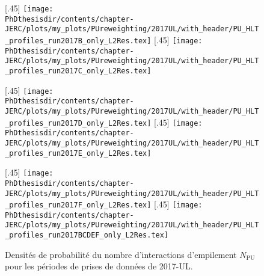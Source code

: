 \begin{figure}[p]
\centering
{}[.45\textwidth]
{\texttt{[image: \\PhDthesisdir/contents/chapter-JERC/plots/my\_plots/PUreweighting/2017UL/with\_header/PU\_HLT\_profiles\_run2017B\_only\_L2Res.tex]}}
\hfill
{}[.45\textwidth]
{\texttt{[image: \\PhDthesisdir/contents/chapter-JERC/plots/my\_plots/PUreweighting/2017UL/with\_header/PU\_HLT\_profiles\_run2017C\_only\_L2Res.tex]}}

\vfill

[.45\textwidth]
{\texttt{[image: \\PhDthesisdir/contents/chapter-JERC/plots/my\_plots/PUreweighting/2017UL/with\_header/PU\_HLT\_profiles\_run2017D\_only\_L2Res.tex]}}
\hfill
{}[.45\textwidth]
{\texttt{[image: \\PhDthesisdir/contents/chapter-JERC/plots/my\_plots/PUreweighting/2017UL/with\_header/PU\_HLT\_profiles\_run2017E\_only\_L2Res.tex]}}

\vfill

[.45\textwidth]
{\texttt{[image: \\PhDthesisdir/contents/chapter-JERC/plots/my\_plots/PUreweighting/2017UL/with\_header/PU\_HLT\_profiles\_run2017F\_only\_L2Res.tex]}}
\hfill
{}[.45\textwidth]
{\texttt{[image: \\PhDthesisdir/contents/chapter-JERC/plots/my\_plots/PUreweighting/2017UL/with\_header/PU\_HLT\_profiles\_run2017BCDEF\_only\_L2Res.tex]}}

\caption[Densités de probabilité de $N_\text{PU}$ pour 2017-UL.]{Densités de probabilité du nombre d'interactions d'empilement $N_\text{PU}$ pour les périodes de prises de données de 2017-UL.}
\label{fig-PU_profile_17UL}
\end{figure}
